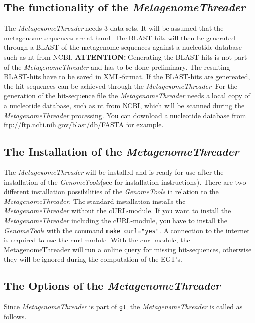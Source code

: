 \documentclass[12pt,titlepage]{article}
\newcommand{\MetagenomeThreader}{\textit{MetagenomeThreader}\xspace}
\newcommand{\GenomeTools}{\textit{GenomeTools}\xspace}
\newcommand{\Gt}{\texttt{gt}\xspace}
\newcommand{\Attention}{\textbf{ATTENTION:}\xspace}
\begin{document}
\subsection{The functionality of the \MetagenomeThreader} \label{Functional}

The \MetagenomeThreader needs 3 data sets. It will be assumed that the metagenome
sequences are at hand. The BLAST-hits will then be generated through a BLAST of
the metagenome-sequences against a nucleotide database such as nt from NCBI.
\Attention Generating the BLAST-hits is not part of the \MetagenomeThreader and
has to be done preliminary. The resulting BLAST-hits have to be saved in XML-format.
If the BLAST-hits are genereated, the hit-sequences can be achieved through the
\MetagenomeThreader. For the generation of the hit-sequence file the \MetagenomeThreader
needs a local copy of a nucleotide database, such as nt from NCBI, which will be scanned
during the \MetagenomeThreader processing. You can download a nucleotide database
from
\\
{\url{ftp://ftp.ncbi.nih.gov/blast/db/FASTA}} for example.

\subsection{The Installation of the \MetagenomeThreader} \label{Install}

The \MetagenomeThreader will be installed and is ready for use after the
installation of the \GenomeTools (see \cite{genometools} for installation instructions).
There are two different installation possibilities of the \GenomeTools in relation to the \MetagenomeThreader.
The standard installation installs the
\\
\MetagenomeThreader without the cURL-module.
If you want to install the \MetagenomeThreader including the cURL-module, you have to install the
\GenomeTools with the command \texttt{make curl="yes"}. A connection to the internet is required to use the
curl module. With the curl-module, the MetagenomeThreader will run a online query for
missing hit-sequences, otherwise they will be ignored during the computation of the EGT's.

\subsection{The Options of the \MetagenomeThreader} \label{Overview}

Since \MetagenomeThreader is part of \Gt, the \MetagenomeThreader is called as follows.
\end{document}
